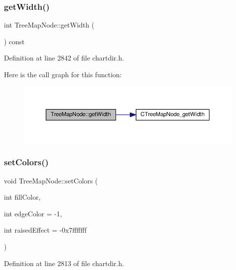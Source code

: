 \subsubsection{\texorpdfstring{get\+Width()}{getWidth()}}
{\footnotesize\ttfamily int Tree\+Map\+Node\+::get\+Width (\begin{DoxyParamCaption}{ }\end{DoxyParamCaption}) const\hspace{0.3cm}{\ttfamily [inline]}}



Definition at line 2842 of file chartdir.\+h.

Here is the call graph for this function\+:
\nopagebreak
\begin{figure}[H]
\begin{center}
\leavevmode
\includegraphics[width=350pt]{class_tree_map_node_ac9cda4e3299ca56a8f7e7cf0a90e23b0_cgraph}
\end{center}
\end{figure}
\mbox{\label{class_tree_map_node_a63211696a930a3e71bb36b1b8da09ed7}} 
\subsubsection{\texorpdfstring{set\+Colors()}{setColors()}}
{\footnotesize\ttfamily void Tree\+Map\+Node\+::set\+Colors (\begin{DoxyParamCaption}\item[{int}]{fill\+Color,  }\item[{int}]{edge\+Color = {\ttfamily -\/1},  }\item[{int}]{raised\+Effect = {\ttfamily -\/0x7fffffff} }\end{DoxyParamCaption})\hspace{0.3cm}{\ttfamily [inline]}}



Definition at line 2813 of file chartdir.\+h.

